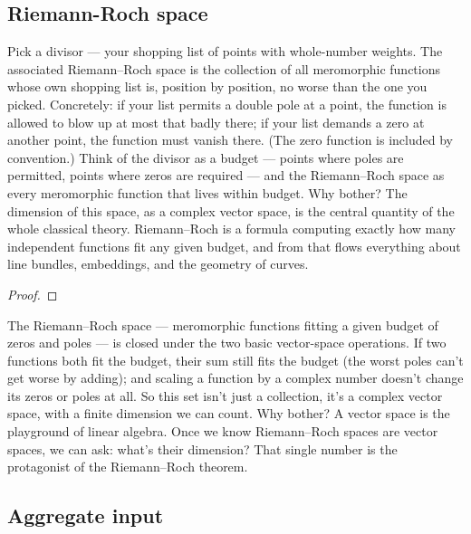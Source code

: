 \subsection{Riemann-Roch space}



\begin{layman}
Pick a divisor --- your shopping list of points with whole-number weights.
The associated Riemann--Roch space is the collection of all meromorphic
functions whose own shopping list is, position by position, no worse than
the one you picked. Concretely: if your list permits a double pole at a
point, the function is allowed to blow up at most that badly there; if
your list demands a zero at another point, the function must vanish there.
(The zero function is included by convention.) Think of the divisor as a
budget --- points where poles are permitted, points where zeros are required ---
and the Riemann--Roch space as every meromorphic function that lives within
budget. Why bother? The dimension of this space, as a complex vector
space, is the central quantity of the whole classical theory. Riemann--Roch
is a formula computing exactly how many independent functions fit any
given budget, and from that flows everything about line bundles,
embeddings, and the geometry of curves.
\end{layman}


\begin{proof}\leanok\end{proof}

\begin{layman}
The Riemann--Roch space --- meromorphic functions fitting a given budget of
zeros and poles --- is closed under the two basic vector-space operations.
If two functions both fit the budget, their sum still fits the budget
(the worst poles can't get worse by adding); and scaling a function by a
complex number doesn't change its zeros or poles at all. So this set
isn't just a collection, it's a complex vector space, with a finite
dimension we can count. Why bother? A vector space is the playground of
linear algebra. Once we know Riemann--Roch spaces are vector spaces, we
can ask: what's their dimension? That single number is the protagonist
of the Riemann--Roch theorem.
\end{layman}

\subsection{Aggregate input}


